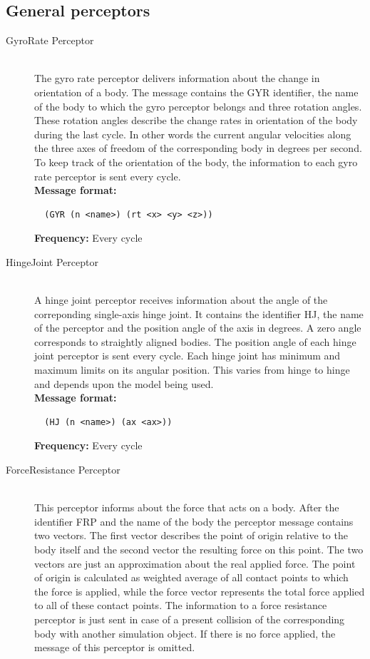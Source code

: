 \subsection{General perceptors}
\begin{description}
  \item [GyroRate Perceptor] \hfill \\
  The gyro rate perceptor delivers information about the change in orientation of a body. The message contains the GYR identifier, the name of the body to which the gyro perceptor belongs and three rotation angles. These rotation angles describe the change rates in orientation of the body during the last cycle. In other words the current angular velocities along the three axes of freedom of the corresponding body in degrees per second. To keep track of the orientation of the body, the information to each gyro rate perceptor is sent every cycle. \hfill \\
  { \bf Message format:}
  \begin{verbatim}
  (GYR (n <name>) (rt <x> <y> <z>))
  \end{verbatim}
   { \bf Frequency:}
	Every cycle\\
  \item [HingeJoint Perceptor] \hfill \\
  A hinge joint perceptor receives information about the angle of the correponding single-axis hinge joint. It contains the identifier HJ, the name of the perceptor and the position angle of the axis in degrees. A zero angle corresponds to straightly aligned bodies. The position angle of each hinge joint perceptor is sent every cycle.
Each hinge joint has minimum and maximum limits on its angular position. This varies from hinge to hinge and depends upon the model being used.\hfill \\
{ \bf Message format:}
  \begin{verbatim}
  (HJ (n <name>) (ax <ax>))
  \end{verbatim}
   { \bf Frequency:}
	Every cycle\\
  \item [ForceResistance Perceptor] \hfill \\
  This perceptor informs about the force that acts on a body. After the identifier FRP and the name of the body the perceptor message contains two vectors. The first vector describes the point of origin relative to the body itself and the second vector the resulting force on this point. The two vectors are just an approximation about the real applied force. The point of origin is calculated as weighted average of all contact points to which the force is applied, while the force vector represents the total force applied to all of these contact points. The information to a force resistance perceptor is just sent in case of a present collision of the corresponding body with another simulation object. If there is no force applied, the message of this perceptor is omitted.

\end{description}
